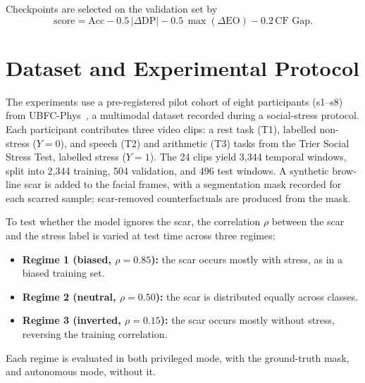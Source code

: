 Checkpoints are selected on the validation set by
\begin{equation}
\text{score} = \text{Acc} - 0.5\,|\Delta\text{DP}| - 0.5\,\max(\Delta\text{EO}) - 0.2\,\text{CF Gap}.
\end{equation}

\section{Dataset and Experimental Protocol}
The experiments use a pre-registered pilot cohort of eight participants (s1--s8) from UBFC-Phys~\cite{sabour2023}, a multimodal dataset recorded during a social-stress protocol. Each participant contributes three video clips: a rest task (T1), labelled non-stress ($Y = 0$), and speech (T2) and arithmetic (T3) tasks from the Trier Social Stress Test, labelled stress ($Y = 1$). The 24 clips yield 3,344 temporal windows, split into 2,344 training, 504 validation, and 496 test windows. A synthetic brow-line scar is added to the facial frames, with a segmentation mask recorded for each scarred sample; scar-removed counterfactuals are produced from the mask.

To test whether the model ignores the scar, the correlation $\rho$ between the scar and the stress label is varied at test time across three regimes:
\begin{itemize}
    \item \textbf{Regime 1 (biased, $\rho = 0.85$):} the scar occurs mostly with stress, as in a biased training set.
    \item \textbf{Regime 2 (neutral, $\rho = 0.50$):} the scar is distributed equally across classes.
    \item \textbf{Regime 3 (inverted, $\rho = 0.15$):} the scar occurs mostly without stress, reversing the training correlation.
\end{itemize}
Each regime is evaluated in both privileged mode, with the ground-truth mask, and autonomous mode, without it.

